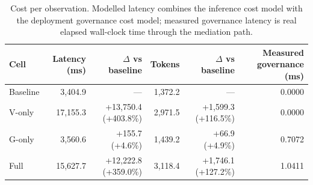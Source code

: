 \begin{table}[htbp]
\centering
\small
\caption{Cost per observation. Modelled latency combines the inference cost model with the deployment governance cost model; measured governance latency is real elapsed wall-clock time through the mediation path.}
\label{tab:gmais-3}
\begin{tabular}{lrrrrr}
\toprule
Cell & Latency (ms) & $\Delta$ vs baseline & Tokens & $\Delta$ vs baseline & Measured governance (ms) \\
\midrule
Baseline & 3,404.9 & --- & 1,372.2 & --- & 0.0000 \\
V-only & 17,155.3 & +13,750.4  (+403.8\%) & 2,971.5 & +1,599.3  (+116.5\%) & 0.0000 \\
G-only & 3,560.6 & +155.7  (+4.6\%) & 1,439.2 & +66.9  (+4.9\%) & 0.7072 \\
Full & 15,627.7 & +12,222.8  (+359.0\%) & 3,118.4 & +1,746.1  (+127.2\%) & 1.0411 \\
\bottomrule
\end{tabular}
\end{table}
